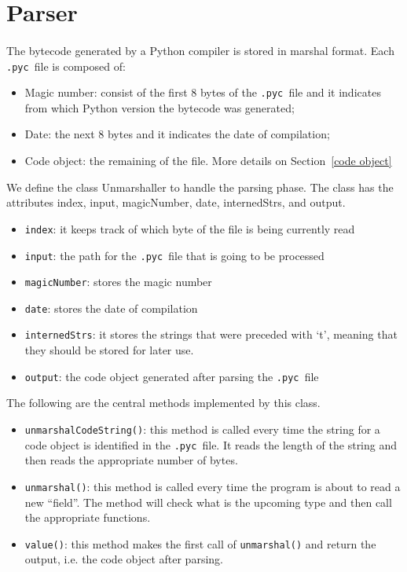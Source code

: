 \documentclass{article}
\newcommand{\pyc}{\texttt{.pyc~}}
\begin{document}
\section{Parser}\label{parser}

\paragraph{}
The bytecode generated by a Python compiler is stored in marshal format. Each \pyc file is composed of:

\begin{itemize}
	\item Magic number: consist of the first 8 bytes of the \pyc file and it indicates from which Python version the bytecode was generated;
	\item Date: the next 8 bytes and it indicates the date of compilation;
	\item Code object: the remaining of the file. More details on Section~\ref{code object}
\end{itemize}

We define the class Unmarshaller to handle the parsing phase. The class has the attributes index, input, magicNumber, date, internedStrs, and output.

\begin{itemize}
	\item \texttt{index}: it keeps track of which byte of the file is being currently read 
	\item \texttt{input}: the path for the \pyc file that is going to be processed
	\item \texttt{magicNumber}: stores the magic number
	\item \texttt{date}: stores the date of compilation
	\item \texttt{internedStrs}: it stores the strings that were preceded with `t', meaning that they should be stored for later use.
	\item \texttt{output}: the code object generated after parsing the \pyc file
\end{itemize}

The following are the central methods implemented by this class.

\begin{itemize}
	\item \texttt{unmarshalCodeString()}:  this method is called every time the string for a code object is identified in the \pyc file. It reads the length of the string and then reads the appropriate number of bytes.
	\item \texttt{unmarshal()}: this method is called every time the program is about to read a new ``field''. The method will check what is the upcoming type and then call the appropriate functions.
	\item \texttt{value()}: this method makes the first call of \texttt{unmarshal()} and return the output, i.e. the code object after parsing.
\end{itemize}
\end{document}
